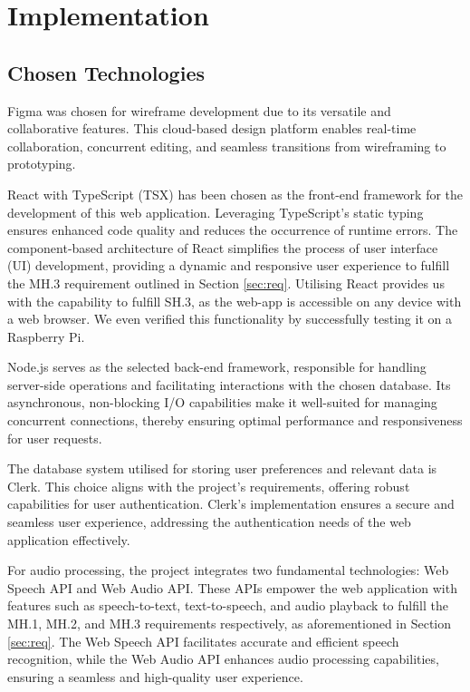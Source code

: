 \documentclass{l4proj}
\begin{document}
\chapter{Implementation}
\label{sec:implementation}

\section{Chosen Technologies}

Figma was chosen for wireframe development due to its versatile and collaborative features. This cloud-based design platform enables real-time collaboration, concurrent editing, and seamless transitions from wireframing to prototyping.

React with TypeScript (TSX) has been chosen as the front-end framework for the development of this web application. Leveraging TypeScript's static typing ensures enhanced code quality and reduces the occurrence of runtime errors. The component-based architecture of React simplifies the process of user interface (UI) development, providing a dynamic and responsive user experience to fulfill the MH.3 requirement outlined in Section \ref{sec:req}. Utilising React provides us with the capability to fulfill SH.3, as the web-app is accessible on any device with a web browser. We even verified this functionality by successfully testing it on a Raspberry Pi.

Node.js serves as the selected back-end framework, responsible for handling server-side operations and facilitating interactions with the chosen database. Its asynchronous, non-blocking I/O capabilities make it well-suited for managing concurrent connections, thereby ensuring optimal performance and responsiveness for user requests.

The database system utilised for storing user preferences and relevant data is Clerk. This choice aligns with the project's requirements, offering robust capabilities for user authentication. Clerk's implementation ensures a secure and seamless user experience, addressing the authentication needs of the web application effectively.

For audio processing, the project integrates two fundamental technologies: Web Speech API and Web Audio API. These APIs empower the web application with features such as speech-to-text, text-to-speech, and audio playback to fulfill the MH.1, MH.2, and MH.3 requirements respectively, as aforementioned in Section \ref{sec:req}. The Web Speech API facilitates accurate and efficient speech recognition, while the Web Audio API enhances audio processing capabilities, ensuring a seamless and high-quality user experience.
\end{document}

